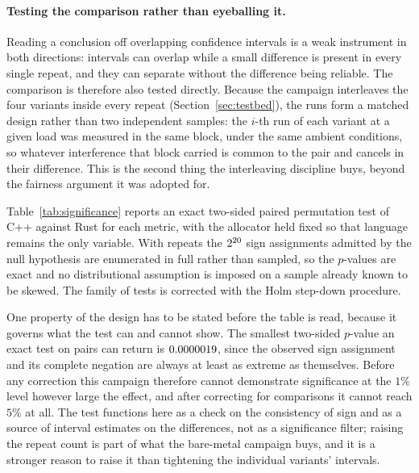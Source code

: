 \documentclass[english,twoside,openright,a4paper,censored,csm,software-track-2020]{HYthesisML}
\begin{document}
\paragraph{Testing the comparison rather than eyeballing it.}
Reading a conclusion off overlapping confidence intervals is a weak instrument in both
directions: intervals can overlap while a small difference is present in every single repeat,
and they can separate without the difference being reliable. The comparison is therefore also
tested directly. Because the campaign interleaves the four variants inside every repeat
(Section~\ref{sec:testbed}), the runs form a matched design rather than two independent
samples: the $i$-th run of each variant at a given load was measured in the same block, under
the same ambient conditions, so whatever interference that block carried is common to the pair
and cancels in their difference. This is the second thing the interleaving discipline buys,
beyond the fairness argument it was adopted for.

Table~\ref{tab:significance} reports an exact two-sided paired permutation test of C++ against
Rust for each metric, with the allocator held fixed so that language remains the only variable.
With \NRepeats{} repeats the $2^{20}$ sign assignments admitted by the null hypothesis
are enumerated in full rather than sampled, so the $p$-values are exact and no distributional
assumption is imposed on a sample already known to be skewed. The family of \NTests{} tests is
corrected with the Holm step-down procedure.

One property of the design has to be stated before the table is read, because it governs what
the test can and cannot show. The smallest two-sided $p$-value an exact test on \NRepeats{}
pairs can return is $0.0000019$, since the observed sign assignment and its complete
negation are always at least as extreme as themselves. Before any correction this campaign
therefore cannot demonstrate significance at the $1\%$ level however large the effect, and
after correcting for \NTests{} comparisons it cannot reach $5\%$ at all. The test functions
here as a check on the consistency of sign and as a source of interval estimates on the
differences, not as a significance filter; raising the repeat count is part of what the
bare-metal campaign buys, and it is a stronger reason to raise it than tightening the
individual variants' intervals.
\end{document}
